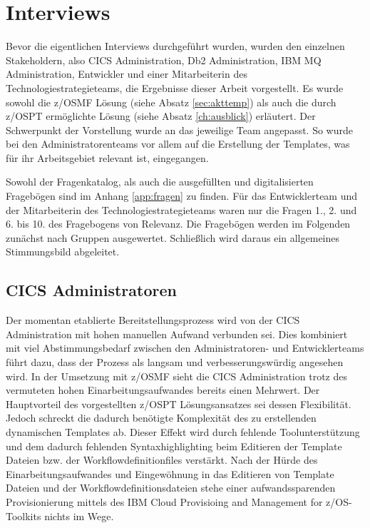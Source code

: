 \section{Interviews}
Bevor die eigentlichen Interviews durchgeführt wurden, wurden den einzelnen Stakeholdern, also CICS Administration, Db2 Administration, IBM MQ Administration, Entwickler und einer Mitarbeiterin des Technologiestrategieteams, die Ergebnisse dieser Arbeit vorgestellt.
Es wurde sowohl die z/OSMF Lösung (siehe Absatz \ref{sec:akttemp}) als auch die durch z/OSPT ermöglichte Lösung (siehe Absatz \ref{ch:ausblick}) erläutert.
Der Schwerpunkt der Vorstellung wurde an das jeweilige Team angepasst.
So wurde bei den Administratorenteams vor allem auf die Erstellung der Templates, was für ihr Arbeitsgebiet relevant ist, eingegangen.

Sowohl der Fragenkatalog, als auch die ausgefüllten und digitalisierten Fragebögen sind im Anhang \ref{app:fragen} zu finden.
Für das Entwicklerteam und der Mitarbeiterin des Technologiestrategieteams waren nur die Fragen 1., 2. und 6. bis 10. des Fragebogens von Relevanz.
Die Fragebögen werden im Folgenden zunächst nach Gruppen ausgewertet.
Schließlich wird daraus ein allgemeines Stimmungsbild abgeleitet.

\subsection{CICS Administratoren}
Der momentan etablierte Bereitstellungsprozess wird von der CICS Administration mit hohen manuellen Aufwand verbunden sei.
Dies kombiniert mit viel Abstimmungsbedarf zwischen den Administratoren- und Entwicklerteams führt dazu, dass der Prozess als langsam und verbesserungswürdig angesehen wird.
In der Umsetzung mit z/OSMF sieht die CICS Administration trotz des vermuteten hohen Einarbeitungsaufwandes bereits einen Mehrwert.
Der Hauptvorteil des vorgestellten z/OSPT Lösungsansatzes sei dessen Flexibilität.
Jedoch schreckt die dadurch benötigte Komplexität des zu erstellenden dynamischen Templates ab.
Dieser Effekt wird durch fehlende Toolunterstützung und dem dadurch fehlenden Syntaxhighlighting beim Editieren der Template Dateien bzw. der Workflowdefinitionfiles verstärkt.
Nach der Hürde des Einarbeitungsaufwandes und Eingewöhnung in das Editieren von Template Dateien und der Workflowdefinitionsdateien stehe einer aufwandssparenden Provisionierung mittels des \glqq IBM Cloud Provisioing and Management for z/OS\grqq-Toolkits nichts im Wege.

